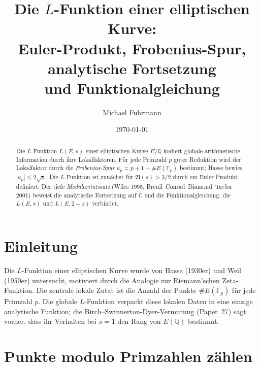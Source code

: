 \documentclass[12pt,a4paper]{amsart}
\theoremstyle{definition}
\newcommand{\Q}{\mathbb{Q}}
\newcommand{\C}{\mathbb{C}}
\newcommand{\Fp}{\mathbb{F}_p}
\begin{document}

\title{Die \texorpdfstring{$L$}{L}-Funktion einer elliptischen Kurve:\\
       Euler-Produkt, Frobenius-Spur, analytische Fortsetzung\\
       und Funktionalgleichung}

\author{Michael Fuhrmann}
\address{Specialist Mathematics Project, Build 84}
\date{\today}

\begin{abstract}
Die $L$-Funktion $L(E,s)$ einer elliptischen Kurve $E/\Q$ kodiert globale
arithmetische Information durch ihre Lokalfaktoren.
F\"ur jede Primzahl $p$ guter Reduktion wird der Lokalfaktor durch die
\emph{Frobenius-Spur} $a_p = p + 1 - \#E(\Fp)$ bestimmt;
Hasse bewies $|a_p| \le 2\sqrt{p}$.
Die $L$-Funktion ist zun\"achst f\"ur $\Re(s) > 3/2$ durch ein Euler-Produkt
definiert.
Der tiefe \emph{Modularit\"atssatz} (Wiles 1995, Breuil--Conrad--Diamond--Taylor 2001)
beweist die analytische Fortsetzung auf $\C$ und die Funktionalgleichung,
die $L(E,s)$ und $L(E,2-s)$ verbindet.
\end{abstract}

\maketitle
\tableofcontents

\section{Einleitung}

Die $L$-Funktion einer elliptischen Kurve wurde von Hasse (1930er) und
Weil (1950er) untersucht, motiviert durch die Analogie zur Riemann'schen
Zeta-Funktion.
Die zentrale lokale Zutat ist die Anzahl der Punkte $\#E(\Fp)$ f\"ur jede
Primzahl $p$.
Die globale $L$-Funktion verpackt diese lokalen Daten in eine einzige
analytische Funktion; die Birch--Swinnerton-Dyer-Vermutung (Paper~27)
sagt vorher, dass ihr Verhalten bei $s=1$ den Rang von $E(\Q)$ bestimmt.

\section{Punkte modulo Primzahlen z\"ahlen}
\end{document}
